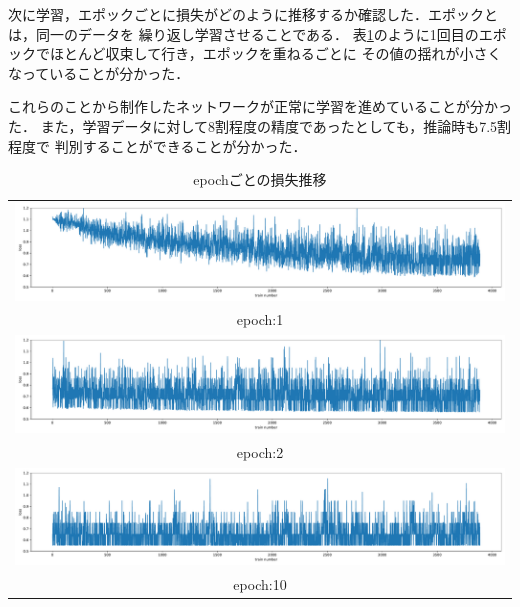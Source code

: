 次に学習，エポックごとに損失がどのように推移するか確認した．エポックとは，同一のデータを
繰り返し学習させることである．
表\ref{epoch}のように1回目のエポックでほとんど収束して行き，エポックを重ねるごとに
その値の揺れが小さくなっていることが分かった．

これらのことから制作したネットワークが正常に学習を進めていることが分かった．
また，学習データに対して8割程度の精度であったとしても，推論時も7.5割程度で
判別することができることが分かった．

\begin{table}[b]
  \begin{center}
    \begin{tabular}{c}
        \includegraphics[width=130mm]{images/net_result/epoch_1.pdf} \\ epoch:1 \\
        \includegraphics[width=130mm]{images/net_result/epoch_2.pdf} \\ epoch:2 \\
        \includegraphics[width=130mm]{images/net_result/epoch_10.pdf} \\ epoch:10 \\
    \end{tabular}
  \end{center}
  \caption{epochごとの損失推移}
  \label{epoch}
\end{table}
\clearpage